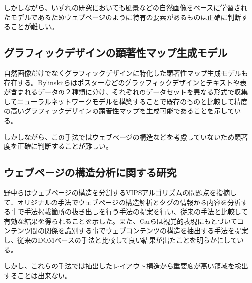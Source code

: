\par しかしながら、いずれの研究においても風景などの自然画像をベースに学習されたモデルであるためウェブページのように特有の要素があるものは正確に判断することが難しい。


\subsection{グラフィックデザインの顕著性マップ生成モデル}\label{subsec:related-02}
\par 自然画像だけでなくグラフィックデザインに特化した顕著性マップ生成モデルも存在する。Bylinskiiらはポスターなどのグラッフィックデザインとテキストや表が含まれるデータの２種類に分け、それぞれのデータセットを異なる形式で収集してニューラルネットワークモデルを構築することで既存のものと比較して精度の高いグラフィックデザインの顕著性マップを生成可能であることを示している\cite{bylinskii2017learning}。
\par しかしながら、この手法ではウェブページの構造などを考慮していないため顕著度を正確に判断することが難しい。


\subsection{ウェブページの構造分析に関する研究}\label{subsec:related-03}
\par 野中らはウェブページの構造を分割するVIPSアルゴリズムの問題点を指摘して、オリジナルの手法でウェブページの構造解析とタグの情報から内容を分析する事で手法掲載箇所の抜き出しを行う手法の提案を行い、従来の手法と比較して有効な結果を得られることを示した\cite{weko_66695_1}。また、Caiらは視覚的表現にもとづいてコンテンツ間の関係を識別する事でウェブコンテンツの構造を抽出する手法を提案し、従来のDOMベースの手法と比較して良い結果が出たことを明らかにしている\cite{cai2003extracting}。
\par しかし、これらの手法では抽出したレイアウト構造から重要度が高い領域を検出することは出来ない。


